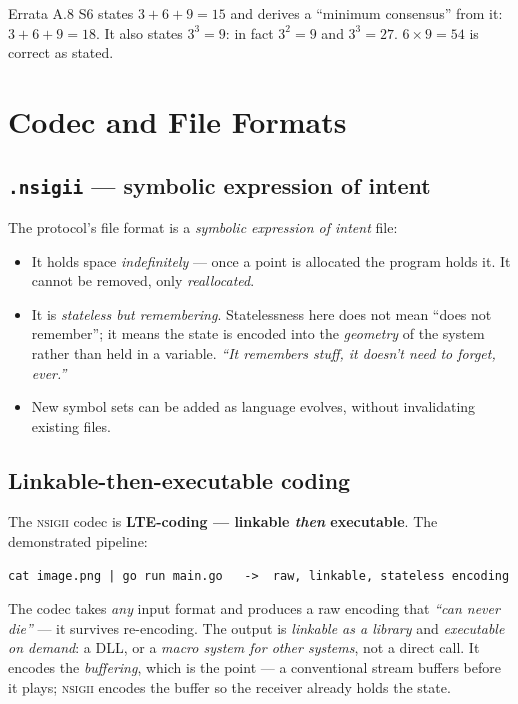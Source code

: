 \documentclass[11pt,a4paper]{article}
\newcommand{\NSIGII}{\textsc{nsigii}}
\begin{document}
\begin{errata}{Errata A.8}
S6 states $3 + 6 + 9 = 15$ and derives a ``minimum consensus'' from it:
$3+6+9 = 18$. It also states $3^{3} = 9$: in fact $3^{2} = 9$ and $3^{3} = 27$.
$6 \times 9 = 54$ is correct as stated.
\end{errata}

\section{Codec and File Formats}
\label{sec:codec}

\subsection{\texttt{.nsigii} --- symbolic expression of intent}

The protocol's file format is a \emph{symbolic expression of intent} file:

\begin{itemize}[leftmargin=*,noitemsep]
  \item It holds space \emph{indefinitely} --- once a point is allocated the
    program holds it. It cannot be removed, only \emph{reallocated}.
  \item It is \emph{stateless but remembering}. Statelessness here does not mean
    ``does not remember''; it means the state is encoded into the \emph{geometry}
    of the system rather than held in a variable. \emph{``It remembers stuff, it
    doesn't need to forget, ever.''}
  \item New symbol sets can be added as language evolves, without invalidating
    existing files.
\end{itemize}

\subsection{Linkable-then-executable coding}

The \NSIGII{} codec is \textbf{LTE-coding --- linkable \emph{then} executable}.
The demonstrated pipeline:

\begin{Verbatim}[fontsize=\small,frame=single]
cat image.png | go run main.go   ->  raw, linkable, stateless encoding
\end{Verbatim}

The codec takes \emph{any} input format and produces a raw encoding that
\emph{``can never die''} --- it survives re-encoding. The output is
\emph{linkable as a library} and \emph{executable on demand}: a DLL, or a
\emph{macro system for other systems}, not a direct call. It encodes the
\emph{buffering}, which is the point --- a conventional stream buffers before it
plays; \NSIGII{} encodes the buffer so the receiver already holds the state.
\end{document}
